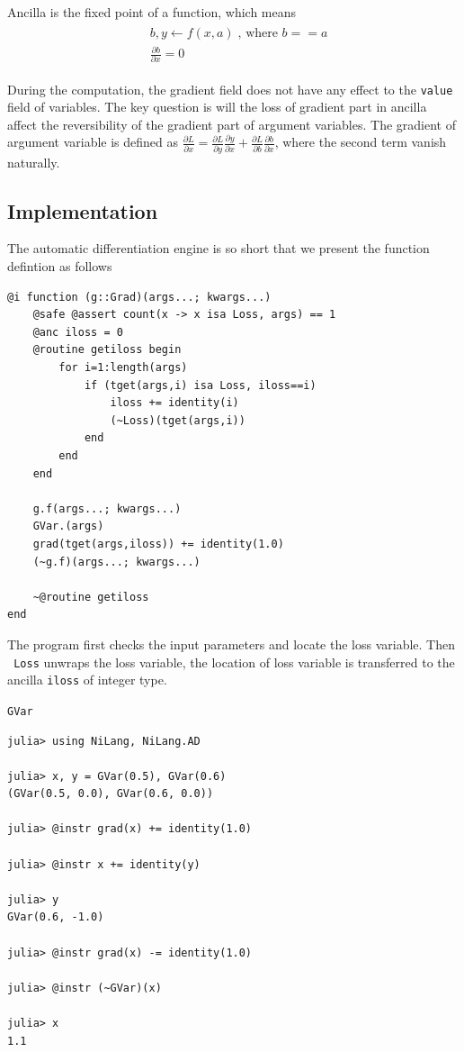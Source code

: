 \documentclass[aps,twocolumn,longbibliography,english,superscriptaddress,prr]{revtex4-1}
\newcommand{\<}{\langle}
\renewcommand{\>}{\rangle}
\theoremstyle{definition}\newtheorem{definition}{\textit{Definition}}
\begin{document}
Ancilla is the fixed point of a function, which means 
\begin{align}
    \begin{split}
    &b, y \leftarrow f(x, a)\; \text{, where } b==a\\
    &\frac{\partial b}{\partial x} = 0
    \end{split}
\end{align}

During the computation, the gradient field does not have any effect to the \texttt{value} field of variables. The key question is will the loss of gradient part in ancilla affect the reversibility of the gradient part of argument variables.
The gradient of argument variable is defined as $\frac{\partial L}{\partial x} = \frac{\partial L}{\partial y}\frac{\partial y}{\partial x} + \frac{\partial L}{\partial b}\frac{\partial b}{\partial x}$, where the second term vanish naturally.

\subsection{Implementation}
The automatic differentiation engine is so short that we present the function defintion as follows

\begin{minipage}{.44\textwidth}
\begin{lstlisting}
@i function (g::Grad)(args...; kwargs...)
    @safe @assert count(x -> x isa Loss, args) == 1
    @anc iloss = 0
    @routine getiloss begin
        for i=1:length(args)
            if (tget(args,i) isa Loss, iloss==i)
                iloss += identity(i)
                (~Loss)(tget(args,i))
            end
        end
    end

    g.f(args...; kwargs...)
    GVar.(args)
    grad(tget(args,iloss)) += identity(1.0)
    (~g.f)(args...; kwargs...)

    ~@routine getiloss
end
\end{lstlisting}
\end{minipage}

The program first checks the input parameters and locate the loss variable.
Then \texttt{~Loss} unwraps the loss variable, the location of loss variable is transferred to the ancilla \texttt{iloss} of integer type.

\texttt{GVar}

\begin{minipage}{.44\textwidth}
\begin{lstlisting}
julia> using NiLang, NiLang.AD

julia> x, y = GVar(0.5), GVar(0.6)
(GVar(0.5, 0.0), GVar(0.6, 0.0))

julia> @instr grad(x) += identity(1.0)

julia> @instr x += identity(y)

julia> y
GVar(0.6, -1.0)

julia> @instr grad(x) -= identity(1.0)

julia> @instr (~GVar)(x)

julia> x
1.1
\end{lstlisting}
\end{minipage}
\end{document}
